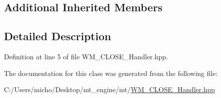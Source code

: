 \subsection*{Additional Inherited Members}


\subsection{Detailed Description}


Definition at line 5 of file W\+M\+\_\+\+C\+L\+O\+S\+E\+\_\+\+Handler.\+hpp.



The documentation for this class was generated from the following file\+:\begin{DoxyCompactItemize}
\item 
C\+:/\+Users/micho/\+Desktop/mt\+\_\+engine/mt/\hyperlink{_w_m___c_l_o_s_e___handler_8hpp}{W\+M\+\_\+\+C\+L\+O\+S\+E\+\_\+\+Handler.\+hpp}\end{DoxyCompactItemize}
